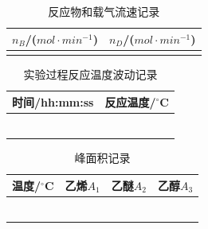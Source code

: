 \documentclass[a4paper]{article}
\begin{document}
\begin{table}[H]
	\begin{center}
		\begin{tabular}{l|l}
			\hline
			$n_{B}$/($mol\cdot min^{-1}$) & $n_{D}$/($mol\cdot min^{-1}$)\\
			\hline
			                              &                              \\
			\hline
		 \end{tabular}
	\end{center}
	\caption{反应物和载气流速记录}
\end{table}

\begin{table}[H]
	\begin{center}
		\begin{tabular}{l|l}
			\hline
			时间/hh:mm:ss &反应温度/$^\circ$C\\
			\hline
						  &                  \\
			\hline
						  &                  \\
			\hline
						  &                  \\
			\hline
						  &                  \\
			\hline
						  &                  \\
			\hline
						  &                  \\
			\hline
		 \end{tabular}
	\end{center}
	\caption{实验过程反应温度波动记录}
\end{table}

\begin{table}[H]
	\begin{center}
		\begin{tabular}{l|l|l|l}
			\hline
			温度/$^\circ$C &乙烯$A_{1}$      &乙醚$A_{2}$  &乙醇$A_{3}$\\ 
			\hline
			&             &          &              \\
			\hline
			&             &          &              \\
			\hline
			&             &          &              \\
			\hline
			&             &          &              \\
			\hline
			&             &          &              \\
			\hline
			&             &          &              \\
			\hline
		 \end{tabular}
	\end{center}
	\caption{峰面积记录}
\end{table}
\end{document}
